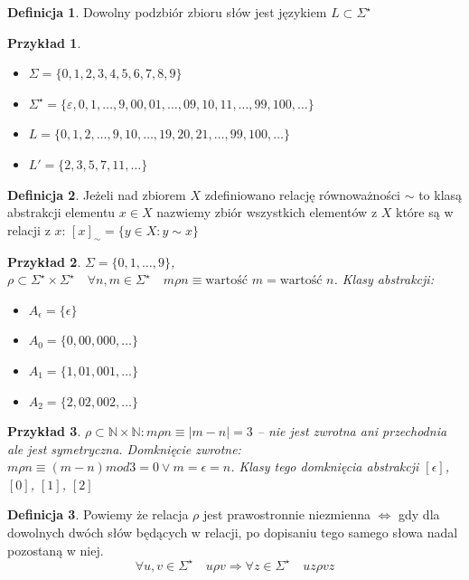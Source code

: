 \documentclass[12pt,a4paper]{article}
\newtheorem{przyklad}{Przykład}
\theoremstyle{definition}
\newtheorem{df}{Definicja}
\begin{document}
	\begin{df}
		Dowolny podzbiór zbioru słów jest językiem $L \subset \Sigma^\star$
	\end{df}

	\begin{przyklad}~\\
		\begin{itemize}
			\item $\Sigma = \{0, 1, 2, 3, 4, 5, 6, 7, 8, 9\}$
			\item $\Sigma^\star = \{\varepsilon, 0, 1, \dots, 9, 00, 01, \dots, 09, 10, 11, \dots, 99, 100, \dots\}$
			\item $L = \{0, 1, 2, \dots, 9, 10, \dots, 19, 20, 21, \dots, 99, 100, \dots \}$
			\item $L' = \{2, 3, 5, 7, 11, \dots \}$
		\end{itemize}
	\end{przyklad}

	\begin{df}
		Jeżeli nad zbiorem $X$ zdefiniowano relację równoważności $\sim$ to klasą abstrakcji elementu $x\in X$ nazwiemy zbiór wszystkich elementów 
		z $X$ które są w relacji z $x$: $[x]_\sim = \{y\in X: y\sim x\}$
	\end{df}		
	
	\begin{przyklad}
		$\Sigma = \{0, 1, \dots, 9\}$, $\rho \subset \Sigma^\star \times \Sigma^\star \quad \forall n,m\in \Sigma^\star \quad m\rho n \equiv
		 \text{wartość } m = \text{wartość } n$. Klasy abstrakcji: \\
		\begin{itemize}
			\item $A_\epsilon = \{\epsilon\}$
			\item $A_0 = \{0, 00, 000, \dots\}$
			\item $A_1 = \{1, 01, 001, \dots\}$
			\item $A_2 = \{2, 02, 002, \dots\}$
		\end{itemize}
	\end{przyklad}		
	
	\begin{przyklad}
		$\rho \subset \mathbb{N} \times \mathbb{N}:  m\rho n \equiv |m-n| = 3$ -- nie jest zwrotna ani przechodnia ale jest symetryczna.
		Domknięcie zwrotne: $m\rho n \equiv (m-n) mod 3 = 0 \vee m = \epsilon = n$. Klasy tego domknięcia abstrakcji $[\epsilon]$, $[0]$, $[1]$, $[2]$
	\end{przyklad}
	
	\begin{df}
		Powiemy że relacja $\rho$ jest prawostronnie niezmienna $\Leftrightarrow$ gdy dla dowolnych dwóch słów będących w relacji, po dopisaniu
		tego samego słowa nadal pozostaną w niej. 
		$$ \forall u, v \in \Sigma^\star \quad u\rho v \Rightarrow \forall z\in\Sigma^\star \quad uz \rho vz $$
	\end{df}
	
\end{document}
